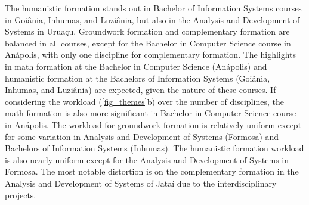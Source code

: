 \documentclass[sigconf, review]{educomp}
\begin{document}
The humanistic formation stands out in Bachelor of Information Systems courses in Goiânia, Inhumas, and Luziânia, but also in the Analysis and Development of Systems in Uruaçu.
Groundwork formation and complementary formation are balanced in all courses, except for the Bachelor in Computer Science course in Anápolis, with only one discipline for complementary formation.
The highlights in math formation at the Bachelor in Computer Science (Anápolis) and humanistic formation at the Bachelors of Information Systems (Goiânia, Inhumas, and Luziânia) are expected, given the nature of these courses.
If considering the workload (\ref{fig_themes}b) over the number of disciplines, the math formation is also more significant in Bachelor in Computer Science course in Anápolis.
The workload for groundwork formation is relatively uniform except for some variation in Analysis and Development of Systems (Formosa) and Bachelors of Information Systems (Inhumas).
The humanistic formation workload is also nearly uniform except for the Analysis and Development of Systems in Formosa.
The most notable distortion is on the complementary formation in the Analysis and Development of Systems of Jataí due to the interdisciplinary projects.
\end{document}
